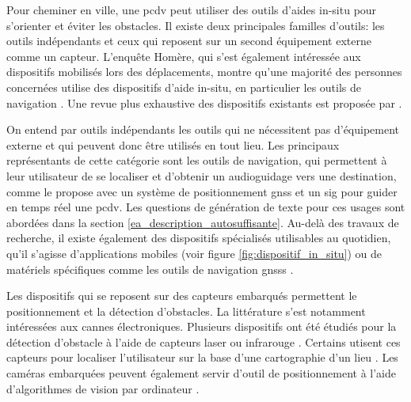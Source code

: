 Pour cheminer en ville, une \gls{pcdv} peut utiliser des outils d'aides in-situ pour s'orienter et éviter les obstacles. Il existe deux principales familles d'outils: les outils indépendants et ceux qui reposent sur un second équipement externe comme un capteur. L'enquête Homère, qui s'est également intéressée aux dispositifs mobilisés lors des déplacements, montre qu'une majorité des personnes concernées utilise des dispositifs d'aide in-situ, en particulier les outils de navigation \citep{homere_2023}. Une revue plus exhaustive des dispositifs existants est proposée par \citet{Kuriakose2022}.

\newpar{}

On entend par outils indépendants les outils qui ne nécessitent pas d'équipement externe et qui peuvent donc être utilisés en tout lieu. Les principaux représentants de cette catégorie sont les outils de navigation, qui permettent à leur utilisateur de se localiser et d'obtenir un audioguidage vers une destination, comme le propose \citet{Golledge1998} avec un système de positionnement \gls{gnss} et un \gls{sig} pour guider en temps réel une \gls{pcdv}. Les questions de génération de texte pour ces usages sont abordées dans la section \ref{ea_description_autosuffisante}. Au-delà des travaux de recherche, il existe également des dispositifs spécialisés utilisables au quotidien, qu'il s'agisse d'applications mobiles (voir figure \ref{fig:dispositif_in_situ}) ou de matériels spécifiques comme les outils de navigation \glspl{gnss} \citep{Refuveille2012}. 

\newpar{}

Les dispositifs qui se reposent sur des capteurs embarqués permettent le positionnement et la détection d'obstacles. La littérature s'est notamment intéressées aux cannes électroniques. Plusieurs dispositifs ont été étudiés pour la détection d'obstacle à l'aide de capteurs laser ou infrarouge \citep{Damaschini2005}. Certains utisent ces capteurs pour localiser l'utilisateur sur la base d'une cartographie d'un lieu \citep{Connier2018}. Les caméras embarquées peuvent également servir d'outil de positionnement à l'aide d'algorithmes de vision par ordinateur \citep{Duh2021}.

\newpar{}


